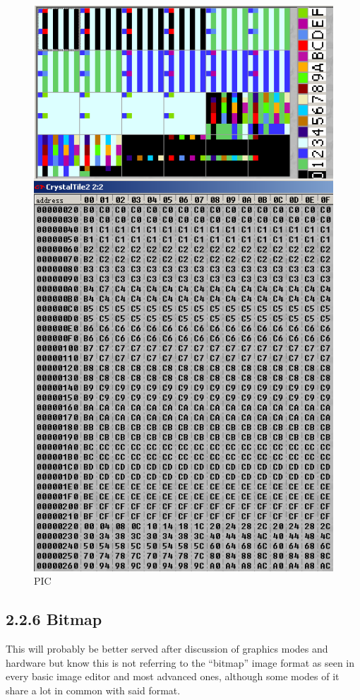 \documentclass[
]{book}
\begin{document}
\begin{figure}
\centering
\includegraphics{images/25_home_fast6191_romhackingguide_unrenamed_file___original_borders_romhackingguide2dGBA24BPP1.png}
\caption{PIC}
\end{figure}

\hypertarget{bitmap}{%
\subsection{2.2.6 Bitmap}\label{bitmap}}

This will probably be better served after discussion of graphics modes and hardware but know this is not referring to the ``bitmap'' image format as seen in every basic image editor and most advanced ones, although some modes of it share a lot in common with said format.
\end{document}
